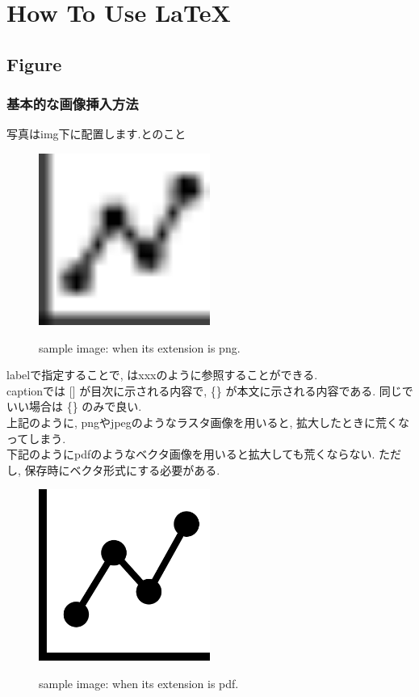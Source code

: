 \documentclass[/Users/ikedahajime/GitHub/reserch/master_report/thesis]{subfiles}
\begin{document}
\chapter{How To Use \LaTeX}

\section{Figure}
    \subsection{基本的な画像挿入方法}
    写真はimg下に配置します.とのこと\\
    \begin{figure}
        \centering
        \includegraphics[width=0.5\textwidth]{img/sample/sample_png.png}
        \label{fig:sample_png}
        \caption[sample image (png)]{sample image: when its extension is png.}
    \end{figure}
    labelで指定することで, はxxxのように参照することができる.\\
    captionでは [] が目次に示される内容で, \{\} が本文に示される内容である. 同じでいい場合は \{\} のみで良い.\\
    上記のように, pngやjpegのようなラスタ画像を用いると, 拡大したときに荒くなってしまう.\\
    下記のようにpdfのようなベクタ画像を用いると拡大しても荒くならない.
    ただし, 保存時にベクタ形式にする必要がある.
    \begin{figure}
        \centering
        \includegraphics[width=0.5\textwidth]{img/sample/sample_pdf.pdf}
        \label{Fig:sample_pdf}
        \caption[sample image (pdf)]{sample image: when its extension is pdf.}
    \end{figure}
\end{document}
